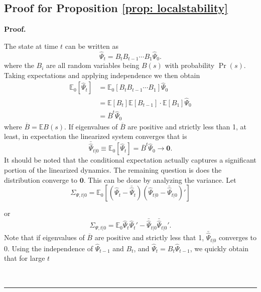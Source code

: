 \documentclass[thmsb,11pt]{article}
\newenvironment{proof}[1][Proof]{\noindent \textbf{#1.} }{\  \rule{0.5em}{0.5em}}
\begin{document}
\subsection{Proof for Proposition \ref{prop: localstability}}
 \begin{proof}

 The state at time $t$ can be written as
 	\[
 		\hat{\Psi}_t = B_tB_{t-1}\cdots B_1\hat{\Psi}_0.
 	\]where the $B_i$ are all random variables being $B(s)$ with probability $\Pr(s)$. Taking expectations and applying independence we then obtain
% 	
 	\begin{align}
 	\mathbb{E}_0[\hat{\Psi}_t] &= \mathbb{E}_0[B_tB_{t-1}\cdots B_1] \hat{\Psi}_0\\
 	&=\mathbb{E}[B_t] \mathbb{E}[B_{t-1}]\cdot\mathbb{E}[B_1] \hat{\Psi}_0\\
 	&=\overline B^t \hat{\Psi}_0
 	\end{align}
 	where $\overline B = \mathbb{E}B(s)$.  If eigenvalues of $\overline B$ are positive and strictly less than 1, at least, in expectation the linearized system converges that is
 	\begin{equation}
 		 \bar{\hat{\Psi}}_{t|0} \equiv \mathbb{E}_0[\hat{\Psi}_t] = \overline {B}^t \hat{\Psi}_0\to\bm 0.
 	\end{equation}It should be noted that the conditional expectation actually captures a significant portion of the linearized dynamics.
	The remaining question is does the distribution converge to $\bm 0$.  This can be done by analyzing the variance.  Let
 	\[
 		\Sigma_{\Psi,t|0} = \mathbb{E}_0\left[(\hat{\Psi}_t-\bar {\hat{\Psi}}_t)(\hat{\Psi}_{t|0}-\bar {\hat{\Psi}}_{t|0})'\right]
 	\]
 	
 	or
 	\begin{equation}
 	 \Sigma_{\Psi,t|0}=\mathbb{E}_{0}\hat{\Psi}_t\hat{\Psi}_t'- \bar{\hat{\Psi}}_{t|0} \bar{\hat{\Psi}}_{t|0} '.
 	\end{equation}
Note that  if eigenvalues of $\overline B$ are positive and strictly less that 1, $\bar{\hat{\Psi}}_{t|0} $ converges to 0.  Using the independence of $\hat{\Psi}_{t-1}$ and $B_t$, and $\hat{\Psi}_t = B_t \hat{\Psi}_{t-1}$, we quickly obtain that for large $t$
 	

\end{proof}
\end{document}
